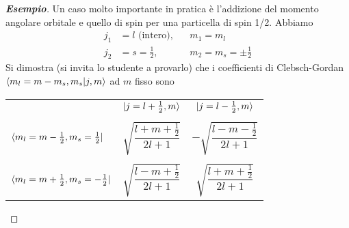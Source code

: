 \begin{proof}[\textbf{Esempio}]
Un caso molto importante in pratica è l'addizione del momento angolare orbitale e quello di spin per una particella di spin 1/2. Abbiamo
\begin{align}
j_1&=l\text{ (intero)}, && m_1=m_l \\
j_2&=s=\frac{1}{2}, && m_2=m_s=\pm\frac{1}{2}
\end{align}
Si dimostra (si invita lo studente a provarlo) che i coefficienti di Clebsch-Gordan $\braket{m_l=m-m_s,m_s|j,m}$ ad $m$ fisso sono

\medskip
\begin{tabular}{lcc}
& $\ket{j=l+\frac{1}{2},m}$ & $\ket{j=l-\frac{1}{2},m}$ \\
& & \\
$\bra{m_l=m-\frac{1}{2},m_s=\frac{1}{2}}$ & $\sqrt{\dfrac{l+m+\frac{1}{2}}{2l+1}}$ & $-\sqrt{\dfrac{l-m-\frac{1}{2}}{2l+1}}$ \\
& & \\
$\bra{m_l=m+\frac{1}{2},m_s=-\frac{1}{2}}$ & $\sqrt{\dfrac{l-m+\frac{1}{2}}{2l+1}}$ & $\sqrt{\dfrac{l+m+\frac{1}{2}}{2l+1}}$
\end{tabular}
\end{proof}

%